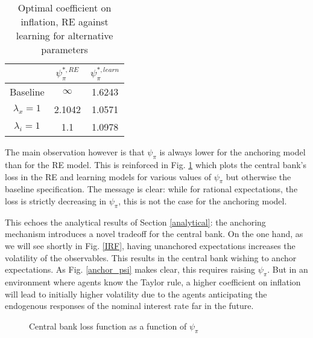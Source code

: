 \documentclass[11pt]{article}
\def \myFigPath {../../figures/}
\renewcommand{\[}{\begin{equation}}
\renewcommand{\]}{\end{equation}}
\def\mySmallerFigScale{0.18}
\begin{document}
\begin{center}
\begin{table}[h!]
\begin{tabular}{ c | c | c }
 & $\psi^{*,RE}_{\pi}$ & $\psi^{*,learn}_{\pi}$  \\  \hline
  Baseline  & $\infty$  & 1.6243 \\  \hline
 $\lambda_x =1 $ & 2.1042  & 1.0571 \\  \hline
 $\lambda_i =1 $ &  1.1  & 1.0978 \\  \hline
\end{tabular}     
      \caption{Optimal coefficient on inflation, RE against learning for alternative parameters}  \label{par_opt}
 \end{table}
\end{center}

\vspace{-1.4cm}
The main observation however is that $\psi_{\pi}$ is always lower for the anchoring model than for the RE model. This is reinforced in Fig. \ref{fig_loss} which plots the central bank's loss in the RE and learning models for various values of $\psi_{\pi}$ but otherwise the baseline specification. The message is clear: while for rational expectations, the loss is strictly decreasing in $\psi_{\pi}$, this is not the case for the anchoring model. 

This echoes the analytical results of Section \ref{analytical}: the anchoring mechanism introduces a novel tradeoff for the central bank. On the one hand, as we will see shortly in Fig. \ref{IRF}, having unanchored expectations increases the volatility of the observables. This results in the central bank wishing to anchor expectations. As Fig. \ref{anchor_psi} makes clear, this requires raising $\psi_{\pi}$. But in an environment where agents know the Taylor rule, a higher coefficient on inflation will lead to initially higher volatility due to the agents anticipating the endogenous responses of the nominal interest rate far in the future.
\begin{figure}[h!]
\caption{Central bank loss function as a function of $\psi_{\pi}$}
\floatfoot{}
\label{fig_loss}
\end{figure}
\end{document}
